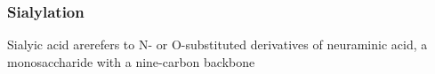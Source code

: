 \subsubsection {Sialylation}
Sialyic acid arerefers to N- or O-substituted derivatives of neuraminic acid, a monosaccharide with a nine-carbon backbone